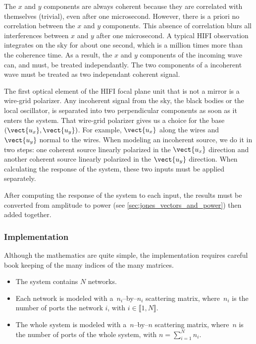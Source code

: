 The $x$ and $y$ components are always coherent because they are correlated with themselves (trivial), even after one microsecond.
However, there is a priori no correlation between the $x$ and $y$ components.
This absence of correlation blurs all interferences between $x$ and $y$ after one microsecond.
A typical HIFI observation integrates on the sky for about one second, which is a million times more than the coherence time.
As a result, the $x$ and $y$ components of the incoming wave can, and must, be treated independantly.
The two components of a incoherent wave must be treated as two independant coherent signal.

The first optical element of the HIFI focal plane unit that is not a mirror is a wire-grid polarizer.
Any incoherent signal from the sky, the black bodies or the local oscillator, is separated into two perpendicular components as soon as it enters the system.
That wire-grid polarizer gives us a choice for the base $(\vect{u_x}, \vect{u_y})$.
For example, $\vect{u_x}$ along the wires and $\vect{u_y}$ normal to the wires.
When modeling an incoherent source, we do it in two steps: one coherent source linearly polarized in the $\vect{u_x}$ direction and another coherent source linearly polarized in the $\vect{u_y}$ direction.
When calculating the response of the system, these two inputs must be applied separately.

After computing the response of the system to each input, the results must be converted from amplitude to power (see \cref{sec:jones_vectors_and_power}) then added together.

\subsubsection{Implementation}
Although the mathematics are quite simple, the implementation requires careful book keeping of the many indices of the many matrices.

\begin{itemize}
    \item 
The system contains $N$ networks.
    \item 
Each network is modeled with a~$n_i$--by--$n_i$ scattering matrix, where~$n_i$ is the number of ports the network $i$, with $i \in \llbracket 1, N \rrbracket$.
    \item 
The whole system is modeled with a~$n$--by--$n$ scattering matrix, where~$n$ is the number of ports of the whole system, with $n = \sum_{i=1}^N n_i$.
\end{itemize}


